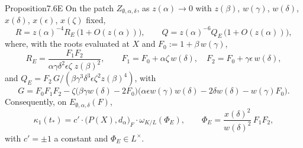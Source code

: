 \documentclass[12pt,letterpaper]{amsart}
\theoremstyle{plain}
\theoremstyle{definition}
\theoremstyle{remark}
\theoremstyle{definition}
\begin{document}
\begin{res}{Proposition}{7.6E}\label{res:7.6E}
On the patch $Z_{\emptyset,\alpha,\delta}$, as $z(\alpha)\to0$ with
$z(\beta)$, $w(\gamma)$, $w(\delta)$, $x(\delta)$, $x(\epsilon)$, $x(\zeta)$
fixed,
\[
R=z(\alpha)^{-4}R_E\,\bigl(1+O(z(\alpha))\bigr),\qquad
Q=z(\alpha)^{-6}Q_E\,\bigl(1+O(z(\alpha))\bigr),
\]
where, with the roots evaluated at $X$ and $F_0:=1+\beta\,w(\gamma)$,
\begin{equation}\tag{7.9}\label{eq:7.9}
R_E=\frac{F_1F_2}{\alpha\gamma\delta^2\epsilon\zeta\;z(\beta)^2},\qquad
F_1=F_0+\alpha\zeta\,w(\delta),\quad
F_2=F_0+\gamma\epsilon\,w(\delta),
\end{equation}
and $Q_E=F_2\,G/(\beta\gamma^3\delta^3\epsilon\zeta^2z(\beta)^4)$, with
\[
G=F_0F_1F_2-\zeta\bigl(\beta\gamma w(\delta)-2F_0\bigr)
\bigl(\alpha\epsilon w(\gamma)w(\delta)-2\delta w(\delta)-w(\gamma)F_0\bigr).
\]
Consequently, on $E_{\emptyset,\alpha,\delta}(F)$,
\begin{equation}\tag{7.10}\label{eq:7.10}
\kappa_1(t_*)=c'\cdot\bigl(P(X),d_\alpha\bigr)_F\cdot\omega_{K/L}(\Phi_E),
\qquad
\Phi_E=\frac{x(\delta)^2}{w(\delta)^2}\,F_1F_2,
\end{equation}
with $c'=\pm1$ a constant and $\Phi_E\in L^\times$.
\end{res}
\end{document}
